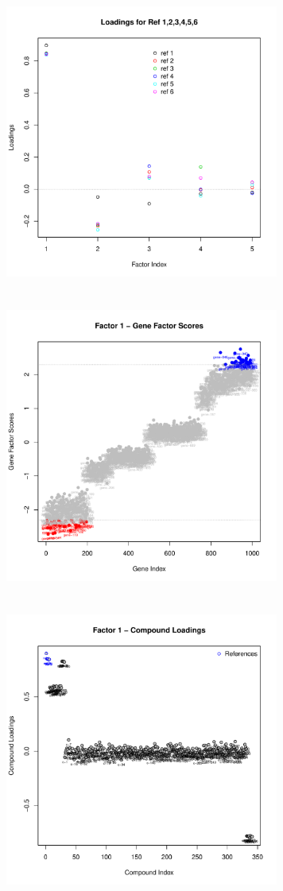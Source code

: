 \documentclass[a4paper]{article}\usepackage[]{graphicx}\usepackage[]{color}
\newenvironment{knitrout}{}{} %
\begin{document}
\begin{knitrout}
\begin{figure}[H]
\includegraphics[width=9cm,height=10cm]{figure/MFA-1} 
\includegraphics[width=9cm,height=10cm]{figure/MFA-2} 
\includegraphics[width=9cm,height=10cm]{figure/MFA-3} 

\end{figure}
\end{knitrout}
\end{document}
